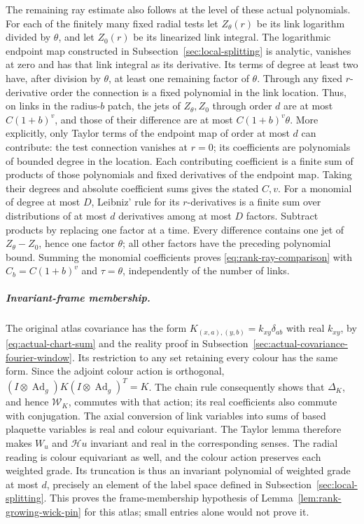 The remaining ray estimate also follows at the level of these actual
polynomials. For each of the finitely many fixed radial tests let
$Z_\theta(r)$ be its link logarithm divided by $\theta$, and let
$Z_0(r)$ be its linearized link integral. The logarithmic endpoint
map constructed in Subsection~\ref{sec:local-splitting} is analytic,
vanishes at zero and has that link integral as its derivative.
Its terms of degree at least two have, after division by $\theta$,
at least one remaining factor of $\theta$. Through any fixed
$r$-derivative order the connection is a fixed polynomial in the
link location. Thus, on links in the radius-$b$ patch, the jets of
$Z_\theta,Z_0$ through order $d$ are at most $C(1+b)^v$, and those
of their difference are at most $C(1+b)^v\theta$. More explicitly,
only Taylor terms of the endpoint map of order at most $d$ can
contribute: the test connection vanishes at $r=0$; its coefficients
are polynomials of bounded degree in the location. Each contributing
coefficient is a finite sum of products of those polynomials and
fixed derivatives of the endpoint map. Taking their degrees and
absolute coefficient sums gives the stated $C,v$.
For a monomial of degree at most $D$, Leibniz' rule for its
$r$-derivatives is a finite sum over distributions of at most $d$
derivatives among at most $D$ factors. Subtract products by replacing
one factor at a time. Every difference contains one jet of
$Z_\theta-Z_0$, hence one factor $\theta$; all other factors have
the preceding polynomial bound. Summing the monomial coefficients
proves \eqref{eq:rank-ray-comparison} with $C_b=C(1+b)^v$ and
$\tau=\theta$, independently of the number of links.

\subparagraph{Invariant-frame membership.}
The original atlas covariance has the form
$K_{(x,a),(y,b)}=k_{xy}\delta_{ab}$ with real $k_{xy}$, by
\eqref{eq:actual-chart-sum} and the reality proof in
Subsection~\ref{sec:actual-covariance-fourier-window}.
Its restriction to any set retaining every colour has the same
form. Since the adjoint colour action is orthogonal,
$(I\otimes\operatorname{Ad}_g)K(I\otimes\operatorname{Ad}_g)^T=K$.
The chain rule consequently shows that $\Delta_K$, and hence
$\mathcal W_K$, commutes with that action; its real coefficients
also commute with conjugation. The axial conversion of link
variables into sums of based plaquette variables is real and
colour equivariant. The Taylor lemma therefore makes $W_u$ and
$\mathcal H u$ invariant and real in the corresponding senses.
The radial reading is colour equivariant as well, and the colour
action preserves each weighted grade. Its truncation is thus an
invariant polynomial of weighted grade at most $d$, precisely an
element of the label space defined in Subsection~\ref{sec:local-splitting}.
This proves the frame-membership hypothesis of
Lemma~\ref{lem:rank-growing-wick-pin} for this atlas; small entries
alone would not prove it.

